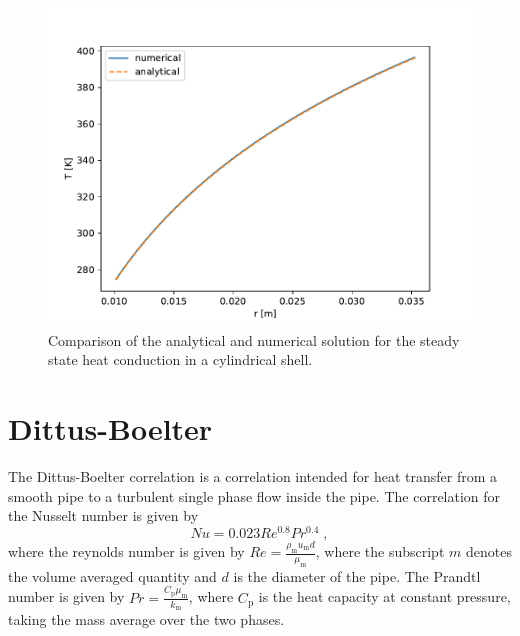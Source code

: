 \documentclass{article}
\begin{document}
\begin{figure}
    \includegraphics[width=\linewidth]{test_wall_conduction.pdf}
    \caption{Comparison of the analytical and numerical solution for the steady state heat conduction in a cylindrical shell.}
    \label{fig:validation_steady_state}
\end{figure}

\section{Dittus-Boelter}
The Dittus-Boelter correlation is a correlation intended for heat transfer from a smooth pipe to a turbulent single phase flow inside the pipe. The correlation for the Nusselt number is given by
\begin{equation}
    Nu = 0.023 Re^{0.8} Pr^{0.4}\;,
\end{equation} 
where the reynolds number is given by $Re = \frac{\rho_{\text{m}} u_{\text{m}} d}{\mu_{\text{m}}}$, where the subscript $m$ denotes the volume averaged quantity and $d$ is the diameter of the pipe. The Prandtl number is given by $Pr = \frac{C_{\text{p}} \mu_{\text{m}}}{k_{\text{m}}}$, where $C_{\text{p}}$ is the heat capacity at constant pressure, taking the mass average over the two phases. 
\end{document}
